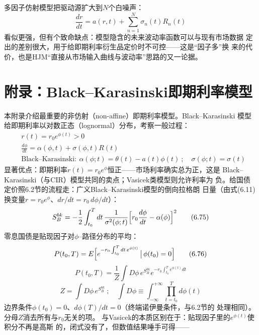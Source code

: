 多因子仿射模型把驱动源扩大到$N$个白噪声：
\begin{equation*}
\frac{dr}{dt}=a(r,t)+\sum_{n=1}^{N}\sigma_n(t)R_n(t)
\end{equation*}
看似更强，但有个致命缺点：模型隐含的未来波动率函数可以与现有市场数据
定出的差别很大，用于给即期利率衍生品定价时不可控——这是“因子多”换
来的代价，也是HJM“直接从市场输入曲线与波动率”思路的又一论据。

\section{附录：Black--Karasinski即期利率模型}

本附录介绍最重要的非仿射（non-affine）即期利率模型。Black--Karasinski
模型给即期利率以对数正态（lognormal）分布，考察一般过程：
\begin{align*}
&r(t)=r_0e^{\phi(t)}>0\\
&\frac{d\phi}{dt}=\alpha(\phi,t)+\sigma(\phi,t)R(t)\\
&\text{Black--Karasinski}:\ \alpha(\phi;t)=\theta(t)-a(t)\phi(t)\ ;\quad
\sigma(\phi;t)=\sigma(t)
\tag{6.74}
\end{align*}
显著优点：即期利率$r(t)=r_0e^{\phi}$恒正——市场利率确实总为正，这是
Black--Karasinski（与CIR）模型共同的卖点；Vasicek类模型则允许利率为
负。给国债定价照6.2节的流程走：广义Black--Karasinski模型的倒向拉格朗
日量（由式(6.11)换变量$r=r_0e^{\phi}$、$dr/dt=r_0\,d\phi/dt$）：
\begin{equation*}
S_B^{bk}=-\frac{1}{2}\int_{t_0}^{T}dt\,\frac{1}{\sigma^2(\phi;t)}
\Bigl[r_0\frac{d\phi}{dt}-\alpha(\phi)\Bigr]^2
\tag{6.75}
\end{equation*}
零息国债是贴现因子对$\phi$--路径分布的平均：
\begin{equation*}
P(t_0,T)=E\Bigl[e^{-r_0\int_{t_0}^{T}dt\,e^{\phi(t)}}
\,\big|\,\phi(t_0)=0\Bigr]
\tag{6.76}
\end{equation*}
\begin{equation*}
P(t_0,T)=\frac{1}{Z}\int D\phi\,e^{S_B^{bk}}
e^{-r_0\int_{t_0}^{T}e^{\phi(t)}dt}
\tag{6.77}
\end{equation*}
\begin{equation*}
Z=\int D\phi\,e^{S_B^{bk}}\ ;\quad
\int D\phi\equiv\int_{-\infty}^{+\infty}\prod_{t=t_0}^{T}d\phi(t)
\tag{6.78}
\end{equation*}
边界条件$\phi(t_0)=0$、$d\phi(T)/dt=0$（终端诺伊曼条件，与6.2节的
处理相同）。分母$Z$消去所有与$r_0$无关的项。
与Vasicek的本质区别在于：贴现因子里的$e^{\phi(t)}$使积分不再是高斯
的，闭式没有了，但数值结果唾手可得——

